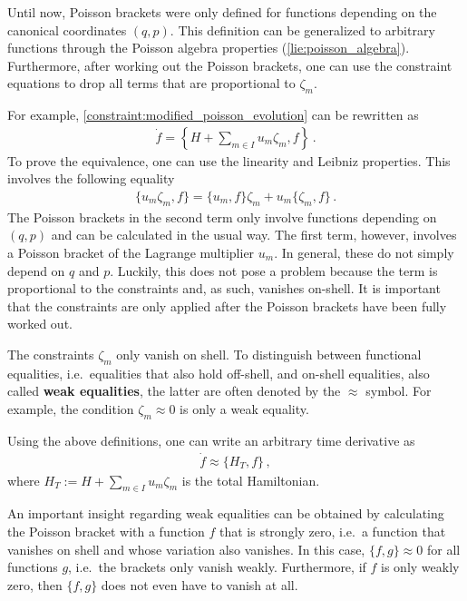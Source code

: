     \begin{method}
        Until now, Poisson brackets were only defined for functions depending on the canonical coordinates $(q,p)$. This definition can be generalized to arbitrary functions through the Poisson algebra properties (\cref{lie:poisson_algebra}). Furthermore, after working out the Poisson brackets, one can use the constraint equations to drop all terms that are proportional to $\zeta_m$.

        For example, \cref{constraint:modified_poisson_evolution} can be rewritten as
        \begin{gather}
            \dot{f} = \left\{H + \sum_{m\in I}u_m\zeta_m,f\right\}\,.
        \end{gather}
        To prove the equivalence, one can use the linearity and Leibniz properties. This involves the following equality
        \begin{gather}
            \{u_m\zeta_m, f\} = \{u_m,f\}\zeta_m + u_m\{\zeta_m,f\}\,.
        \end{gather}
        The Poisson brackets in the second term only involve functions depending on $(q,p)$ and can be calculated in the usual way. The first term, however, involves a Poisson bracket of the Lagrange multiplier $u_m$. In general, these do not simply depend on $q$ and $p$. Luckily, this does not pose a problem because the term is proportional to the constraints and, as such, vanishes on-shell. It is important that the constraints are only applied after the Poisson brackets have been fully worked out.
    \end{method}

    \begin{notation}
        The constraints $\zeta_m$ only vanish on shell. To distinguish between functional equalities, i.e.~equalities that also hold off-shell, and on-shell equalities, also called \textbf{weak equalities}, the latter are often denoted by the $\approx$ symbol. For example, the condition $\zeta_m\approx0$ is only a weak equality.
    \end{notation}
    Using the above definitions, one can write an arbitrary time derivative as
    \begin{gather}
        \dot{f}\approx\{H_T,f\}\,,
    \end{gather}
    where $H_T := H + \sum_{m\in I}u_m\zeta_m$ is the total Hamiltonian.

    \begin{remark}[Closure]
        An important insight regarding weak equalities can be obtained by calculating the Poisson bracket with a function $f$ that is strongly zero, i.e.~a function that vanishes on shell and whose variation also vanishes. In this case, $\{f,g\}\approx0$ for all functions $g$, i.e.~the brackets only vanish weakly. Furthermore, if $f$ is only weakly zero, then $\{f,g\}$ does not even have to vanish at all.
    \end{remark}

